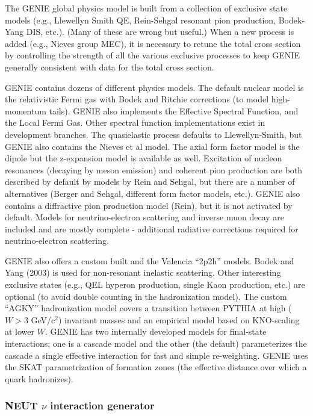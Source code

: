 The GENIE global physics model is built from a collection of exclusive state models (e.g., Llewellyn Smith QE, Rein-Sehgal resonant pion production, Bodek-Yang DIS, etc.).
(Many of these are wrong but useful.) 
When a new process is added (e.g., Nieves group MEC), it is necessary to retune the total cross section by controlling the strength of all the various exclusive processes to keep GENIE generally consistent with data for the total cross section.

GENIE contains dozens of different physics models.
The default nuclear model is the relativistic Fermi gas with Bodek and Ritchie corrections (to model high-momentum tails).
GENIE also implements the Effective Spectral Function, and the Local Fermi Gas.
Other spectral function implementations exist in development branches.
The quasielastic process defaults to Llewellyn-Smith, but GENIE also contains the Nieves et al model. 
The axial form factor model is the dipole but the z-expansion model is available as well.
Excitation of nucleon resonances (decaying by meson emission) and coherent pion production are both described by default by models by Rein and Sehgal, but there are a number of alternatives (Berger and Sehgal, different form factor models, etc.).
GENIE also contains a diffractive pion production model (Rein), but it is not activated by default.
Models for neutrino-electron scattering and inverse muon decay are included and are mostly complete - additional radiative corrections required for neutrino-electron scattering.

GENIE also offers a custom built and the Valencia ``2p2h'' models.
Bodek and Yang (2003) is used for non-resonant inelastic scattering.
Other interesting exclusive states (e.g., QEL hyperon production, single Kaon production, etc.) are optional (to avoid double counting in the hadronization model).
The custom ``AGKY'' hadronization model covers a transition between PYTHIA at high ($W > 3$ GeV/c$^2$) invariant masses and an empirical model based on KNO-scaling at lower $W$.
GENIE has two internally developed models for final-state interactions; one is a cascade model and the other (the default) parameterizes the cascade a single effective interaction for fast and simple re-weighting.
GENIE uses the SKAT parametrization of formation zones (the effective distance over which a quark hadronizes).


\subsubsection{NEUT $\nu$ interaction generator}

